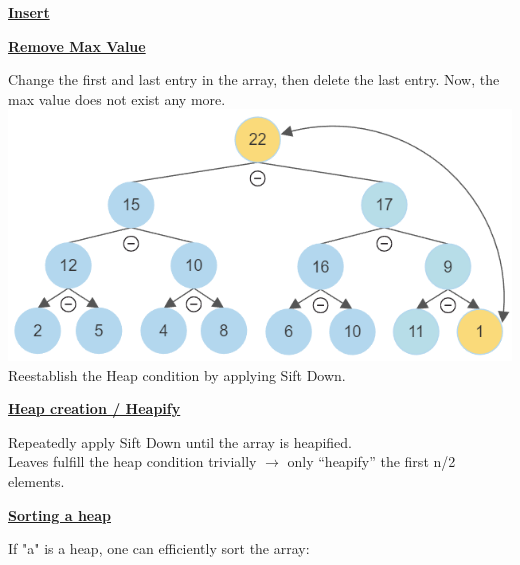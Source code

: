     {\centering\underline{\textbf{Insert}} \par}
        

    {\centering\underline{\textbf{Remove Max Value}} \par}
        Change the first and last entry in the array, then delete the last entry. Now, the max value does not exist any more.
        \includegraphics[width = \linewidth]{src/4_data_structure/images/heap_remove_max.png}
        Reestablish the Heap condition by applying Sift Down.
        

    {\centering\underline{\textbf{Heap creation / Heapify}} \par}
        Repeatedly apply Sift Down until the array is heapified.\\
        Leaves fulfill the heap condition trivially $\rightarrow$ only “heapify” the first n/2 elements.
        

    {\centering\underline{\textbf{Sorting a heap}} \par}
        If "a" is a heap, one can efficiently sort the array:
        
    
